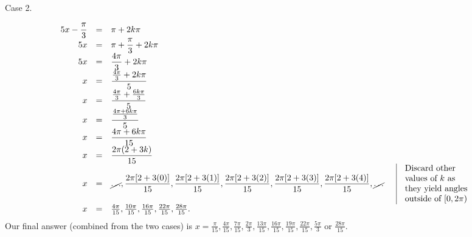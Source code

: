 {\noindent Case 2.

\[
\begin{array}{rcll|l}
\displaystyle 5x-\frac{\pi}{3}&=&\displaystyle \pi+2k\pi\\
\displaystyle 5x&=&\displaystyle \pi+\frac{\pi}{3}+2k\pi\\
\displaystyle 5x&=&\displaystyle \frac{4\pi}{3}+2k\pi\\
\displaystyle x&=&\displaystyle \frac{\frac{4\pi}{3}+2k\pi}{5}\\
\displaystyle x&=&\displaystyle \frac{\frac{4\pi}{3}+\frac{6k\pi}{3}}{5}\\
\displaystyle x&=&\displaystyle \frac{\frac{4\pi+6k\pi}{3}}{5}\\
\displaystyle x&=&\displaystyle \frac{{4\pi+6k\pi}}{15}\\
\displaystyle x&=&\displaystyle \frac{{2\pi(2+3k)}}{15}\\
\displaystyle x&=&\displaystyle \cancel{\dots},\frac{2\pi[2+3(0)]}{15}, \frac{2\pi[2+3(1)]}{15}, \frac{2\pi[2+3(2)]}{15},\frac{2\pi[2+3(3)]}{15},\frac{2\pi[2+3(4)]}{15},\cancel{\dots} &&
\begin{array}{l}
\text{Discard other}\\
\text{values of }k \text{ as} \\
\text{they yield angles}\\
\text{outside of }[0,2\pi)
\end{array}
\\
x&=& \frac{4\pi}{15}, \frac{10\pi}{15}, \frac{16\pi}{15},\frac{22\pi}{15}, \frac{28\pi}{15}.
\end{array}
\]
Our final answer (combined from the two cases) is $\displaystyle x=\frac{\pi}{15}, \frac{4\pi}{15}, \frac{7\pi}{15}, \frac{2\pi}{3}, \frac{13\pi}{15}, \frac{16\pi}{15}, \frac{19\pi}{15}, \frac{22\pi}{15}, \frac{5\pi}{3}$ or $\frac{28\pi}{15}$.
}


